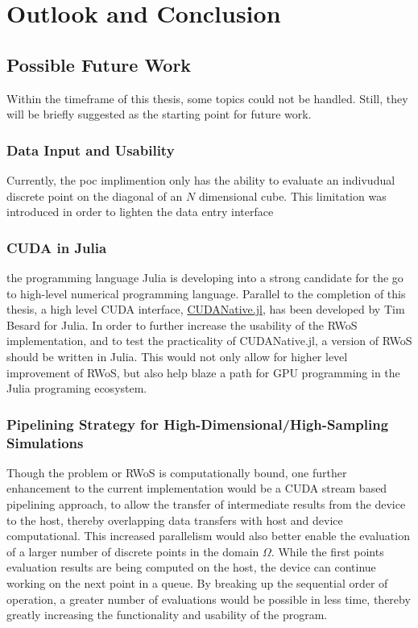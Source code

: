 \chapter{Outlook and Conclusion}
\label{chapter:outlook_and_conclusion}
\section{Possible Future Work}
Within the timeframe of this thesis, some topics could not be handled.  Still,
they will be briefly suggested as the starting point for future work.
\subsection{Data Input and Usability}
Currently, the \gls{poc} implimention only has the ability to evaluate an indivudual discrete point
on the diagonal of an $N$ dimensional cube.  This limitation was introduced in order
to lighten the data entry interface
\subsection{CUDA in Julia}
the programming language Julia is developing into a strong candidate for the go
to high-level numerical programming language.  Parallel to the completion of this
thesis, a high level CUDA interface, \href{https://github.com/JuliaGPU/CUDAnative.jl}
{CUDANative.jl}, has been developed by Tim Besard for Julia. In order to further increase the
usability of the \Gls{RWoS} implementation, and to test the practicality of  CUDANative.jl,
a version of \Gls{RWoS} should be written in Julia.  This would not only allow
for higher level improvement of \Gls{RWoS}, but also help blaze a path for
GPU programming in the Julia programing ecosystem.

\subsection{Pipelining Strategy for High-Dimensional/High-Sampling Simulations}
Though the problem or \Gls{RWoS} is computationally bound, one further enhancement
to the current implementation would be a CUDA stream based pipelining approach,
to allow the transfer of intermediate results from the device to the host,
thereby overlapping data transfers with host and device computational.  This increased
parallelism would also better enable the evaluation of a larger number of discrete
 points in the domain $\Omega$.  While the first points evaluation results are being
 computed on the host, the device can continue working on the next point in a queue.
 By breaking up the sequential order of operation, a greater number of evaluations
 would be possible in less time, thereby greatly increasing the functionality and
 usability of the program.
